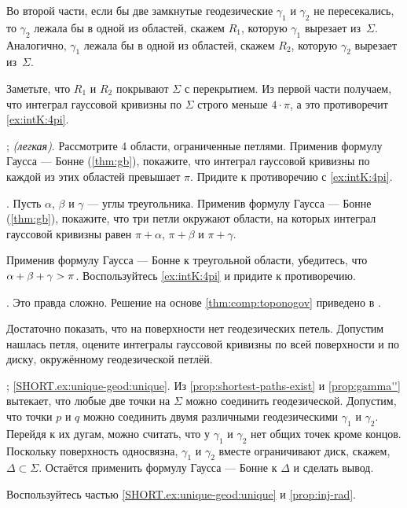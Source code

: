 \begin{multicols}{2}
Во второй части, если бы две замкнутые геодезические $\gamma_1$ и $\gamma_2$ не пересекались, то 
$\gamma_2$ лежала бы в одной из областей, скажем $R_1$, которую $\gamma_1$ вырезает из~$\Sigma$.
Аналогично, $\gamma_1$ лежала бы в одной из областей, скажем $R_2$, которую $\gamma_2$ вырезает из~$\Sigma$.

Заметьте, что $R_1$ и $R_2$ покрывают $\Sigma$ с перекрытием.
Из первой части получаем, что интеграл гауссовой кривизны по $\Sigma$ строго меньше $4\cdot\pi$, а это противоречит \ref{ex:intK:4pi}.

\parbf{\ref{ex:self-intersections}}; \textit{(легкая)}.
Рассмотрите 4 области, ограниченные петлями.
Применив формулу Гаусса --- Бонне (\ref{thm:gb}), покажите, что интеграл гауссовой кривизны по каждой из этих областей превышает $\pi$.
Придите к противоречию с \ref{ex:intK:4pi}.

.
Пусть $\alpha$, $\beta$ и $\gamma$ --- углы треугольника.
Применив формулу Гаусса --- Бонне (\ref{thm:gb}), покажите, что три петли окружают области, на которых интеграл гауссовой кривизны равен $\pi+\alpha$, $\pi+\beta$ и $\pi+\gamma$.

Применив формулу Гаусса --- Бонне к треугольной области, убедитесь, что $\alpha+\beta\z+\gamma>\pi$.
Воспользуйтесь \ref{ex:intK:4pi} и придите к противоречию.

.
Это правда сложно.
Решение на основе \ref{thm:comp:toponogov} приведено в \cite{petrunin2021}.

Достаточно показать, что на поверхности нет геодезических петель.
Допустим нашлась петля, оцените интегралы гауссовой кривизны по всей поверхности и по диску, окружённому геодезической петлёй.

\parbf{\ref{ex:unique-geod}}; \ref{SHORT.ex:unique-geod:unique}.
Из \ref{prop:shortest-paths-exist} и \ref{prop:gamma''} вытекает, что любые две точки на $\Sigma$ можно соединить геодезической.
Допустим, что точки $p$ и $q$ можно соединить двумя различными геодезическими $\gamma_1$ и $\gamma_2$.
Перейдя к их дугам, можно считать, что у $\gamma_1$ и $\gamma_2$ нет общих точек кроме концов.
Поскольку поверхность односвязна, $\gamma_1$ и $\gamma_2$ вместе ограничивают диск, скажем, $\Delta\subset\Sigma$.
Остаётся применить формулу Гаусса --- Бонне к $\Delta$ и сделать вывод.

Воспользуйтесь частью \ref{SHORT.ex:unique-geod:unique} и \ref{prop:inj-rad}.


\end{multicols}
